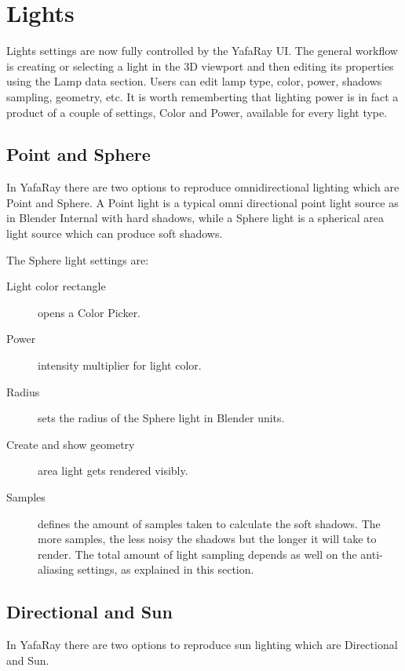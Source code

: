 \section{Lights}

Lights settings are now fully controlled by the YafaRay UI. The general workflow is creating or selecting a light in the 3D viewport and then editing its properties using the Lamp data section. Users can edit lamp type, color, power, shadows sampling, geometry, etc. It is worth rememberting that lighting power is in fact a product of a couple of settings, Color and Power, available for every light type.

\subsection{Point and Sphere}

In YafaRay there are two options to reproduce omnidirectional lighting which are Point and Sphere. A Point light is a typical omni directional point light source as in Blender Internal with hard shadows, while a Sphere light is a spherical area light source which can produce soft shadows.

The Sphere light settings are:
\begin{description}
\item[Light color rectangle] opens a Color Picker.
\item[Power] intensity multiplier for light color.
\item[Radius] sets the radius of the Sphere light in Blender units.
\item[Create and show geometry] area light gets rendered visibly.
\item[Samples] defines the amount of samples taken to calculate the soft shadows. The more samples, the less noisy the shadows but the longer it will take to render. The total amount of light sampling depends as well on the anti-aliasing settings, as explained in this section.
\end{description}


\subsection{Directional and Sun}

In YafaRay there are two options to reproduce sun lighting which are Directional and Sun.


